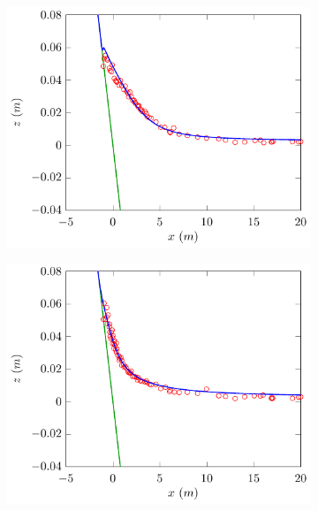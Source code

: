 \begin{figure}
\begin{subfigure}{0.5\textwidth}
		\includegraphics[width=\textwidth]{./chp6/figures/Experiment/Synolakis/H0p0185/FDVM/50s.pdf}
	\end{subfigure}%
	\begin{subfigure}{0.5\textwidth}
		\includegraphics[width=\textwidth]{./chp6/figures/Experiment/Synolakis/H0p0185/FDVM/60s.pdf}
	\end{subfigure}
	\begin{subfigure}{0.5\textwidth}

\end{subfigure}
\end{figure}
